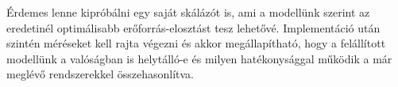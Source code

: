 Érdemes lenne kipróbálni egy saját skálázót is, ami a modellünk szerint az eredetinél optimálisabb erőforrás-elosztást tesz lehetővé. Implementáció után szintén méréseket kell rajta végezni és akkor megállapítható, hogy a felállított modellünk a valóságban is helytálló-e és milyen hatékonysággal működik a már meglévő rendszerekkel összehasonlítva. 


